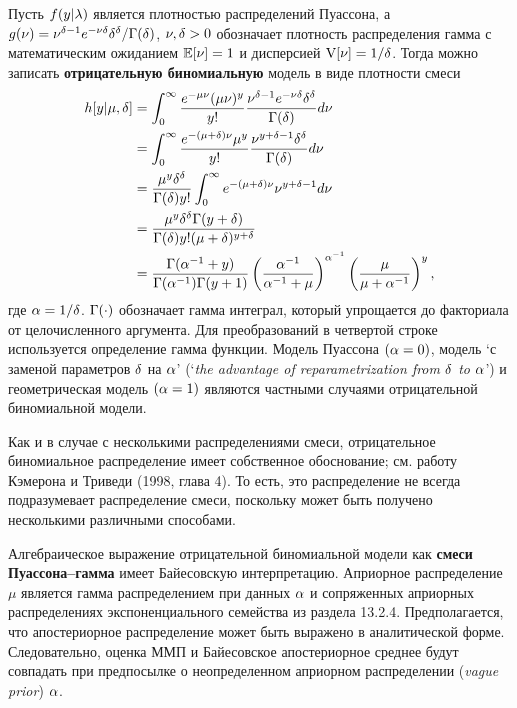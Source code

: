 Пусть $f(y|\lambda)$ является плотностью распределений Пуассона, а $g(\nu) = \nu^{\delta - 1}e^{-\nu\delta}\delta^\delta / \Gamma(\delta)$, $\nu, \delta > 0$ обозначает плотность распределения гамма с математическим ожиданием $\mathbb{E}[\nu] = 1$ и дисперсией $\mathrm{V}[\nu] = 1/\delta$. Тогда можно записать \textbf{отрицательную биномиальную} модель в виде плотности смеси %
    \begin{align}\label{eq:20.12}
    h[y|\mu, \delta]   &= \int^{\infty}_{0} \frac{e^{-\mu\nu}(\mu\nu)^y}{y!} \frac{\nu^{\delta - 1}e^{-\nu\delta}\delta^\delta}{\Gamma(\delta)} d\nu \\
                    &= \int^{\infty}_{0} \frac{e^{-(\mu + \delta)\nu} \mu^y}{y!} \frac{\nu^{y + \delta - 1} \delta^\delta}{\Gamma(\delta)} d\nu \notag \\
                    &= \frac{\mu^y \delta^\delta}{\Gamma(\delta) y!} \int^{\infty}_{0} e^{-(\mu + \delta)\nu} \nu^{y + \delta - 1} d\nu \notag \\
                    &= \frac{\mu^y \delta^\delta \Gamma(y + \delta)}{\Gamma(\delta) y! (\mu + \delta)^{y + \delta}} \notag \\
                    &= \frac{\Gamma(\alpha^{-1} + y)}{\Gamma(\alpha^{-1}) \Gamma(y + 1)} \left( \frac{\alpha^{-1}}{\alpha^{-1} +\mu } \right)^{\alpha^{-1}} \left( \frac{\mu}{\mu + \alpha^{-1}} \right)^{y}, \notag
    \end{align}
где $\alpha = 1/\delta$. $\Gamma(\cdot)$ обозначает гамма интеграл, который упрощается до факториала от целочисленного аргумента. Для преобразований в четвертой строке используется определение гамма функции. Модель Пуассона $(\alpha = 0)$, модель `с заменой параметров $\delta$ на $\alpha$' (`\textit{the advantage of reparametrization from $\delta$ to $\alpha$}') и геометрическая модель $(\alpha = 1)$ являются частными случаями отрицательной биномиальной модели.

Как и в случае с несколькими распределениями смеси, отрицательное биномиальное распределение имеет собственное обоснование; см. работу Кэмерона и Триведи (1998, глава 4). То есть, это распределение не всегда подразумевает распределение смеси, поскольку может быть получено несколькими различными способами.

Алгебраическое выражение отрицательной биномиальной модели как \textbf{смеси Пуассона--гамма} имеет Байесовскую интерпретацию. Априорное распределение $\mu$ является гамма распределением при данных $\alpha$ и сопряженных априорных распределениях  экспоненциального семейства из раздела 13.2.4. Предполагается, что апостериорное распределение может быть выражено в аналитической форме. Следовательно, оценка ММП и Байесовское апостериорное среднее будут совпадать при предпосылке о неопределенном априорном распределении (\textit{vague prior}) $\alpha$.

